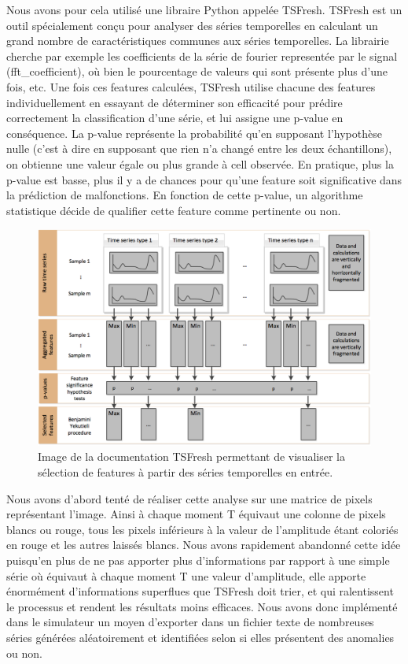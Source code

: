\documentclass[french]{article}
\theoremstyle{mytheoremstyle}
\theoremstyle{mytheoremstyle}
\theoremstyle{myproblemstyle}
\begin{document}
        Nous avons pour cela utilisé une libraire Python appelée TSFresh. TSFresh est un outil spécialement conçu pour analyser des séries temporelles en calculant un grand nombre de caractéristiques communes aux séries temporelles\cite{tsfreshfeatures}. La librairie cherche par exemple les coefficients de la série de fourier representée par le signal (fft\_coefficient), où bien le pourcentage de valeurs qui sont présente plus d'une fois, etc. Une fois ces features calculées, TSFresh utilise chacune des features individuellement en essayant de déterminer son efficacité pour prédire correctement la classification d'une série, et lui assigne une p-value en conséquence. La p-value représente la probabilité qu'en supposant l'hypothèse nulle (c'est à dire en supposant que rien n'a changé entre les deux échantillons), on obtienne une valeur égale ou plus grande à cell observée. En pratique, plus la p-value est basse, plus il y a de chances pour qu'une feature soit significative dans la prédiction de malfonctions. En fonction de cette p-value, un algorithme statistique décide de qualifier cette feature comme pertinente ou non.
        
        \begin{figure}[H]
            \centering
            \includegraphics[width=.8\textwidth]{images/features_extraction.png}
            \caption{Image de la documentation TSFresh permettant de visualiser la sélection de features à partir des séries temporelles en entrée.}
            \label{}
        \end{figure}
        
        
        Nous avons d'abord tenté de réaliser cette analyse sur une matrice de pixels représentant l'image. Ainsi à chaque moment T équivaut une colonne de pixels blancs ou rouge, tous les pixels inférieurs à la valeur de l'amplitude étant coloriés en rouge et les autres laissés blancs. Nous avons rapidement abandonné cette idée puisqu'en plus de ne pas apporter plus d'informations par rapport à une simple série où équivaut à chaque moment T une valeur d'amplitude, elle apporte énormément d'informations superflues que TSFresh doit trier, et qui ralentissent le processus et rendent les résultats moins efficaces. Nous avons donc implémenté dans le simulateur un moyen d'exporter dans un fichier texte de nombreuses séries générées aléatoirement et identifiées selon si elles présentent des anomalies ou non.
        
\end{document}
